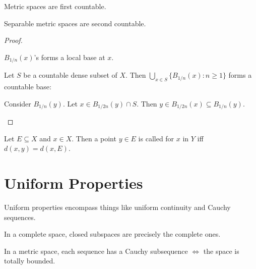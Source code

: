 	
	\begin{lem}\label{LEM: separable metric spaces are second countable}
		\leavevmode
		\begin{mylist}
			\item Metric spaces are first countable.
			\item Separable metric spaces are second countable.
		\end{mylist}
	\end{lem}
	
	\begin{proof}
		\begin{mylist}
			\item $B_{1/n}(x)$'s forms a local base at $x$.
			
			\item Let $S$ be a countable dense subset of $X$. Then $\bigcup_{x\in S}\{ B_{1/n}(x) : n\ge 1 \}$ forms a countable base:
			\begin{subproof}
				Consider $B_{1/n}(y)$. Let $x\in B_{1/2n}(y)\cap S$. Then $y\in B_{1/2n}(x)\subseteq B_{1/n}(y)$.\qedhere
			\end{subproof}
		\end{mylist}
	\end{proof}

	Let $E\subseteq X$ and $x\in X$. Then a point $y\in E$ is called  for $x$ in $Y$ iff $d(x, y) = d(x, E)$.
	
	

\section{Uniform Properties}

Uniform properties encompass things like uniform continuity and Cauchy sequences.



\begin{lem}\label{LEM: closed subsets in complete spaces}
	In a complete space, closed subspaces are precisely the complete ones.
\end{lem}


\begin{lem}
	In a metric space, each sequence has a Cauchy subsequence $\iff$ the space is totally bounded.
\end{lem}

